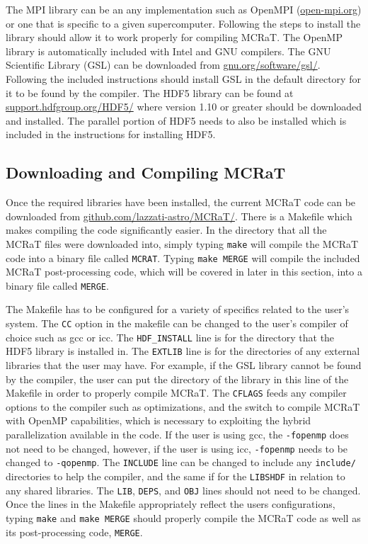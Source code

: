 \documentclass[12pt,a4paper]{article}
\begin{document}
The MPI library can be an any implementation such as OpenMPI (\href{http://www.openmp.org/}{open-mpi.org}) or one that is specific to a given supercomputer. Following the steps to install the library should allow it to work properly for compiling MCRaT. The OpenMP library is automatically included with Intel and GNU compilers. The GNU Scientific Library (GSL) can be downloaded from \href{https://www.gnu.org/software/gsl/}{gnu.org/software/gsl/}. Following the included instructions should install GSL in the default directory for it to be found by the compiler. The HDF5 library can be found at \href{https://support.hdfgroup.org/HDF5/}{support.hdfgroup.org/HDF5/} where version 1.10 or greater should be downloaded and installed. The parallel portion of HDF5 needs to also be installed which is included in the instructions for installing HDF5.

\subsection{Downloading and Compiling MCRaT}
Once the required libraries have been installed, the current MCRaT code can be downloaded from \href{https://github.com/lazzati-astro/MCRaT/tree/master/HYBRID_PARALLEL_KN}{github.com/lazzati-astro/MCRaT/}. There is a Makefile which  makes compiling the code significantly easier. In the directory that all the MCRaT files were downloaded into, simply typing \texttt{make} will compile the MCRaT code into a binary file called \texttt{MCRAT}. Typing \texttt{make MERGE} will compile the included MCRaT post-processing code, which will be covered in later in this section, into a binary file called \texttt{MERGE}.

The Makefile has to be configured for a variety of specifics related to the user's system. The \texttt{CC} option in the makefile can be changed to the user's compiler of choice such as gcc or icc. The \texttt{HDF\_INSTALL} line is for the directory that the HDF5 library is installed in. The \texttt{EXTLIB} line is for the directories of any external libraries that the user may have. For example, if the GSL library cannot be found by the compiler, the user can put the directory of the library in this line of the Makefile in order to properly compile MCRaT. The \texttt{CFLAGS} feeds any compiler options to the compiler such as optimizations, and the switch to compile MCRaT with OpenMP capabilities, which is necessary to exploiting the hybrid parallelization available in the code. If the user is using gcc, the \texttt{-fopenmp} does not need to be changed, however, if the user is using icc, \texttt{-fopenmp} needs to be changed to \texttt{-qopenmp}. The \texttt{INCLUDE} line can be changed to include any \texttt{include/} directories to help the compiler, and the same if for the \texttt{LIBSHDF} in relation to any shared libraries. The \texttt{LIB}, \texttt{DEPS}, and \texttt{OBJ} lines should not need to be changed. Once the lines in the Makefile appropriately reflect the users configurations, typing \texttt{make} and \texttt{make MERGE} should properly compile the MCRaT code as well as its post-processing code, \texttt{MERGE}.
\end{document}
